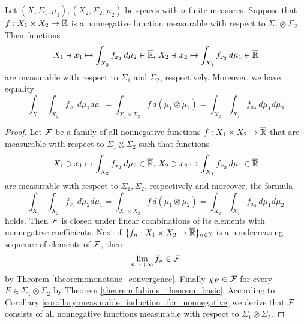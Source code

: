 \begin{theorem}\label{theorem:Tonellis_theorem_for_measurable_functions}
Let $(X,\Sigma_1,\mu_1), (X_2,\Sigma_2,\mu_2)$ be spaces with $\sigma$-finite measures. Suppose that $f:X_1\times X_2\rightarrow \overline{{\mathbb R}}$ is a nonnegative function measurable with respect to $\Sigma_1\otimes \Sigma_2$. Then functions
$$X_1\ni x_1 \mapsto \int_{X_2}f_{x_1}\,d\mu_2\in \overline{{\mathbb R}},\,X_2\ni x_2 \mapsto \int_{X_1}f_{x_2}\,d\mu_1\in \overline{{\mathbb R}}$$
are measurable with respect to $\Sigma_1$ and $\Sigma_2$, respectively. Moreover, we have equality
$$\int_{X_1}\int_{X_2}f_{x_1}\,d\mu_2d\mu_1 = \int_{X_1\times X_2}f\,d(\mu_1\otimes \mu_2) = \int_{X_2}\int_{X_1}f_{x_2}\,d\mu_1d\mu_2$$
\end{theorem}
\begin{proof}
Let ${\mathcal F}$ be a family of all nonnegative functions $f:X_1\times X_2\rightarrow \overline{{\mathbb R}}$ that are measurable with respect to $\Sigma_1\otimes \Sigma_2$ such that functions
$$X_1\ni x_1\mapsto \int_{X_2}f_{x_1}\,d\mu_2\in \overline{{\mathbb R}},\,X_2\ni x_2\mapsto \int_{X_1}f_{x_2}\,d\mu_1\in \overline{{\mathbb R}}$$
are measurable with respect to $\Sigma_1, \Sigma_2$, respectively and moreover, the formula
$$\int_{X_1}\int_{X_2}f_{x_1}\,d\mu_2d\mu_1 = \int_{X_1\times X_2}f\,d(\mu_1\otimes \mu_2) = \int_{X_2}\int_{X_1}f_{x_2}\,d\mu_1d\mu_2$$
holds. Then ${\mathcal F}$ is closed under linear combinations of its elements with nonnegative coefficients. Next if $\{f_n:X_1\times X_2\rightarrow \overline{{\mathbb R}}\}_{n\in {\mathbb N}}$ is a nondecreasing sequence of elements of ${\mathcal F}$, then
$$\lim_{n\rightarrow +\infty}f_n\in {\mathcal F}$$
by Theorem \ref{theorem:monotone_convergence}. Finally $\chi_E\in {\mathcal F}$ for every $E\in \Sigma_1\otimes \Sigma_2$ by Theorem \ref{theorem:fubinis_theorem_basic}. According to Corollary \ref{corollary:measurable_induction_for_nonnegative} we derive that ${\mathcal F}$ consists of all nonnegative functions measurable with respect to $\Sigma_1\otimes \Sigma_2$.
\end{proof}

